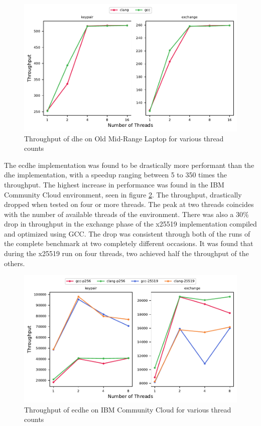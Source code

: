 \begin{figure}
    \centering
    \includegraphics[scale=0.75]{chapters/results/throughput/Old Mid-Range Laptop_dh.pdf}
    \caption{Throughput of \acrshort{dhe} on Old Mid-Range Laptop for various thread counts}
    \label{figure:results:throughput:dh-old-mid-range-laptop}
\end{figure}

The \gls{ecdhe} implementation was found to be drastically more performant than the \gls{dhe} implementation, with a speedup ranging between 5 to 350 times the throughput. The highest increase in performance was found in the IBM Community Cloud environment, seen in figure \ref{figure:results:throughput:ecdh-ibm-community-cloud}. The throughput, drastically dropped when tested on four or more threads. The peak at two threads coincides with the number of available threads of the environment. There was also a 30\% drop in throughput in the exchange phase of the \gls{x25519} implementation compiled and optimized using GCC. The drop was consistent through both of the runs of the complete benchmark at two completely different occasions. It was found that during the \gls{x25519} run on four threads, two achieved half the throughput of the others.

\begin{figure}
    \centering
    \includegraphics[scale=0.75]{chapters/results/throughput/IBM Community Cloud_ecdh.pdf}
    \caption{Throughput of \acrshort{ecdhe} on IBM Community Cloud for various thread counts}
    \label{figure:results:throughput:ecdh-ibm-community-cloud}
\end{figure}

